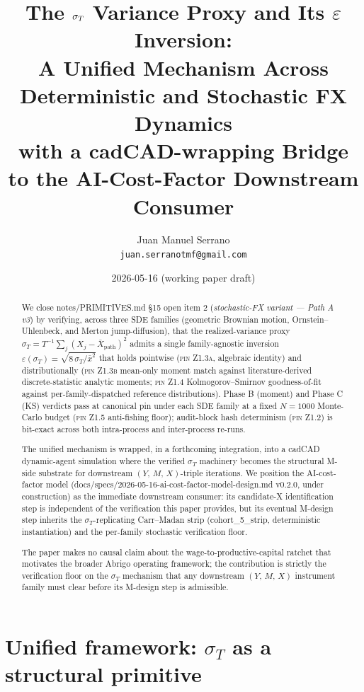 \documentclass[11pt,letterpaper]{article}
\title{%
    The $\sigmaT$ Variance Proxy and Its $\varepsilon$ Inversion: \\
    A Unified Mechanism Across Deterministic and Stochastic FX Dynamics \\
    \large with a cadCAD-wrapping Bridge to the AI-Cost-Factor Downstream Consumer
}
\author{%
    Juan Manuel Serrano \\
    \texttt{juan.serranotmf@gmail.com}
}
\date{2026-05-16 \quad (working paper draft)}
\newcommand{\sigmaT}{\sigma_{T}}
\newcommand{\xbar}{\bar{x}}
\newcommand{\Ymx}{(Y,\,M,\,X)}
\newcommand{\PinZ}[1]{\textsc{pin Z1.#1}}
\begin{document}
\maketitle

\begin{abstract}
We close \textsf{notes/PRIMITIVES.md} \S15 open item 2 (\emph{stochastic-FX
variant — Path A v3}) by verifying, across three SDE families (geometric
Brownian motion, Ornstein--Uhlenbeck, and Merton jump-diffusion), that the
realized-variance proxy
\(\sigmaT = T^{-1} \sum_{j} (X_j - \bar X_{\text{path}})^2\)
admits a single family-agnostic inversion
\(\varepsilon(\sigmaT) = \sqrt{8\,\sigmaT/\xbar^{2}}\)
that holds pointwise (\PinZ{3a}, algebraic identity) and distributionally
(\PinZ{3b} mean-only moment match against literature-derived discrete-statistic
analytic moments; \PinZ{4} Kolmogorov--Smirnov goodness-of-fit against
per-family-dispatched reference distributions). Phase B (moment) and
Phase C (KS) verdicts pass at canonical pin under each SDE family at a fixed
\(N = 1000\) Monte-Carlo budget (\PinZ{5} anti-fishing floor); audit-block
hash determinism (\PinZ{2}) is bit-exact across both intra-process and
inter-process re-runs.

The unified mechanism is wrapped, in a forthcoming integration, into a
cadCAD dynamic-agent simulation where the verified $\sigmaT$ machinery
becomes the structural M-side substrate for downstream
\(\Ymx\)-triple iterations. We position the AI-cost-factor model
(\textsf{docs/specs/2026-05-16-ai-cost-factor-model-design.md} v0.2.0,
under construction) as the immediate downstream consumer: its candidate-X
identification step is independent of the verification this paper provides,
but its eventual M-design step inherits the \(\sigmaT\)-replicating
Carr--Madan strip (\textsf{cohort\_5\_strip}, deterministic instantiation)
and the per-family stochastic verification floor.

The paper makes no causal claim about the wage-to-productive-capital
ratchet that motivates the broader Abrigo operating framework; the
contribution is strictly the verification floor on the $\sigmaT$ mechanism
that any downstream \(\Ymx\) instrument family must clear before its
M-design step is admissible.
\end{abstract}

\tableofcontents

\section{Unified framework: $\sigmaT$ as a structural primitive}
\label{sec:framework}
\end{document}
